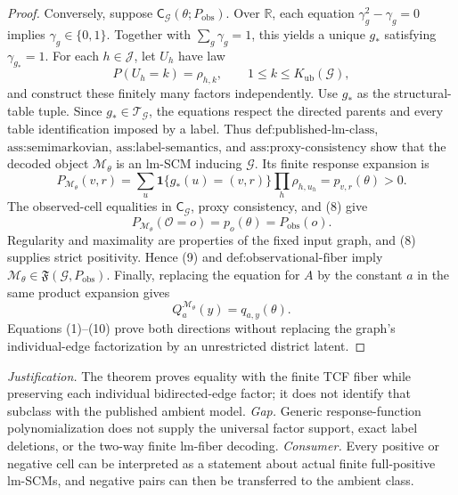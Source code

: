 \documentclass{article}
\begin{document}
\begin{proof}
Conversely, suppose \(\mathsf C_{\mathcal G}(\theta;P_{\mathrm{obs}})\). Over \(\mathbb R\), each equation \(\gamma_g^2-\gamma_g=0\) implies \(\gamma_g\in\{0,1\}\). Together with \(\sum_g\gamma_g=1\), this yields a unique \(g_*\) satisfying \(\gamma_{g_*}=1\). For each \(h\in\mathcal J\), let \(U_h\) have law
\[
P(U_h=k)=\rho_{h,k},
\qquad 1\leq k\leq K_{\mathrm{ub}}(\mathcal G),
\tag{7}
\]
and construct these finitely many factors independently. Use \(g_*\) as the structural-table tuple. Since \(g_*\in\mathcal T_{\mathcal G}\), the equations respect the directed parents and every table identification imposed by a label. Thus \(\text{def:published-lm-class}\), \(\text{ass:semimarkovian}\), \(\text{ass:label-semantics}\), and \(\text{ass:proxy-consistency}\) show that the decoded object \(\mathcal M_\theta\) is an lm-SCM inducing \(\mathcal G\). Its finite response expansion is
\[
P_{\mathcal M_\theta}(v,r)
=\sum_u\mathbf 1\{g_*(u)=(v,r)\}\prod_h\rho_{h,u_h}
=p_{v,r}(\theta)>0.
\tag{8}
\]
The observed-cell equalities in \(\mathsf C_{\mathcal G}\), proxy consistency, and (8) give
\[
P_{\mathcal M_\theta}(\mathcal O=o)=p_o(\theta)=P_{\mathrm{obs}}(o).
\tag{9}
\]
Regularity and maximality are properties of the fixed input graph, and (8) supplies strict positivity. Hence (9) and \(\text{def:observational-fiber}\) imply \(\mathcal M_\theta\in\mathfrak F(\mathcal G,P_{\mathrm{obs}})\). Finally, replacing the equation for \(A\) by the constant \(a\) in the same product expansion gives
\[
Q_a^{\mathcal M_\theta}(y)=q_{a,y}(\theta).
\tag{10}
\]
Equations (1)--(10) prove both directions without replacing the graph's individual-edge factorization by an unrestricted district latent.
\end{proof}
\par\smallskip\noindent \textit{Justification.} The theorem proves equality with the finite TCF fiber while preserving each individual bidirected-edge factor; it does not identify that subclass with the published ambient model. \textit{Gap.} Generic response-function polynomialization does not supply the universal factor support, exact label deletions, or the two-way finite lm-fiber decoding. \textit{Consumer.} Every positive or negative cell can be interpreted as a statement about actual finite full-positive lm-SCMs, and negative pairs can then be transferred to the ambient class.
\end{document}

